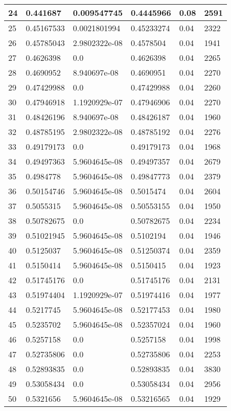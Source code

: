 \begin{longtable}{|l|l|l|l|l|l|}
24 & 0.441687 & 0.009547745 & 0.4445966 & 0.08 & 2591 \\ \hline 
25 & 0.45167533 & 0.0021801994 & 0.45233274 & 0.04 & 2322 \\ \hline 
26 & 0.45785043 & 2.9802322e-08 & 0.4578504 & 0.04 & 1941 \\ \hline 
27 & 0.4626398 & 0.0 & 0.4626398 & 0.04 & 2265 \\ \hline 
28 & 0.4690952 & 8.940697e-08 & 0.4690951 & 0.04 & 2270 \\ \hline 
29 & 0.47429988 & 0.0 & 0.47429988 & 0.04 & 2260 \\ \hline 
30 & 0.47946918 & 1.1920929e-07 & 0.47946906 & 0.04 & 2270 \\ \hline 
31 & 0.48426196 & 8.940697e-08 & 0.48426187 & 0.04 & 1960 \\ \hline 
32 & 0.48785195 & 2.9802322e-08 & 0.48785192 & 0.04 & 2276 \\ \hline 
33 & 0.49179173 & 0.0 & 0.49179173 & 0.04 & 1968 \\ \hline 
34 & 0.49497363 & 5.9604645e-08 & 0.49497357 & 0.04 & 2679 \\ \hline 
35 & 0.4984778 & 5.9604645e-08 & 0.49847773 & 0.04 & 2379 \\ \hline 
36 & 0.50154746 & 5.9604645e-08 & 0.5015474 & 0.04 & 2604 \\ \hline 
37 & 0.5055315 & 5.9604645e-08 & 0.50553155 & 0.04 & 1950 \\ \hline 
38 & 0.50782675 & 0.0 & 0.50782675 & 0.04 & 2234 \\ \hline 
39 & 0.51021945 & 5.9604645e-08 & 0.5102194 & 0.04 & 1946 \\ \hline 
40 & 0.5125037 & 5.9604645e-08 & 0.51250374 & 0.04 & 2359 \\ \hline 
41 & 0.5150414 & 5.9604645e-08 & 0.5150415 & 0.04 & 1923 \\ \hline 
42 & 0.51745176 & 0.0 & 0.51745176 & 0.04 & 2131 \\ \hline 
43 & 0.51974404 & 1.1920929e-07 & 0.51974416 & 0.04 & 1977 \\ \hline 
44 & 0.5217745 & 5.9604645e-08 & 0.52177453 & 0.04 & 1980 \\ \hline 
45 & 0.5235702 & 5.9604645e-08 & 0.52357024 & 0.04 & 1960 \\ \hline 
46 & 0.5257158 & 0.0 & 0.5257158 & 0.04 & 1998 \\ \hline 
47 & 0.52735806 & 0.0 & 0.52735806 & 0.04 & 2253 \\ \hline 
48 & 0.52893835 & 0.0 & 0.52893835 & 0.04 & 3830 \\ \hline 
49 & 0.53058434 & 0.0 & 0.53058434 & 0.04 & 2956 \\ \hline 
50 & 0.5321656 & 5.9604645e-08 & 0.53216565 & 0.04 & 1929 \\ \hline 
\end{longtable}